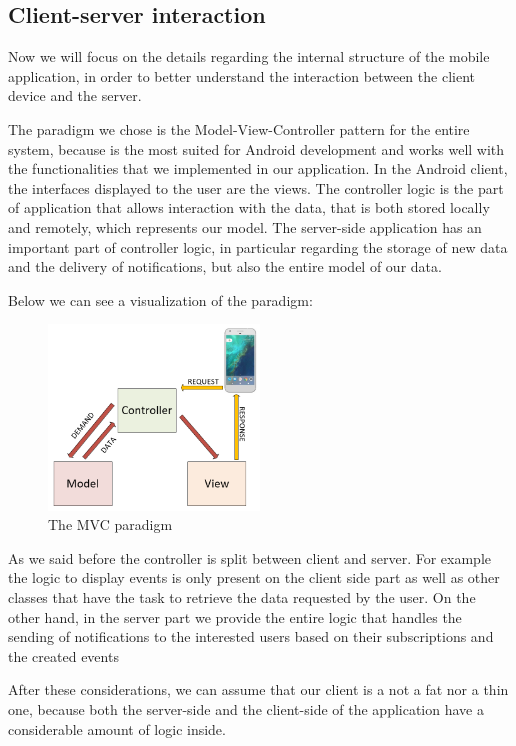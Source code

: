 \documentclass[a4paper]{scrreprt}
\begin{document}
\subsection{Client-server interaction}
Now we will focus on the details regarding the internal structure of the mobile application, in order to better understand the interaction between the client device and the server.

\bigskip The paradigm we chose is the Model-View-Controller pattern for the entire system, because is the most suited for Android development and works well with the functionalities that we implemented in our application. In the Android client, the interfaces displayed to the user are the views. The controller logic is the part of application that allows interaction with the data, that is both stored locally and remotely, which represents our model. The server-side application has an important part of controller logic, in particular regarding the storage of new data and the delivery of notifications, but also the entire model of our data.

\bigskip Below we can see a visualization of the paradigm:
\begin{figure}[H]
	\centering
	\includegraphics[width=0.5\textwidth]{imgs/mvc}
	\caption{The MVC paradigm}
\end{figure}

As we said before the controller is split between client and server. For example the logic to display events is only present on the client side part as well as other classes that have the task to retrieve the data requested by the user. On the other hand, in the server part we provide the entire logic that handles the sending of notifications to the interested users based on their subscriptions and the created events

\bigskip After these considerations, we can assume that our client is a not a fat nor a thin one, because both the server-side and the client-side of the application have a considerable amount of logic inside.
\end{document}

